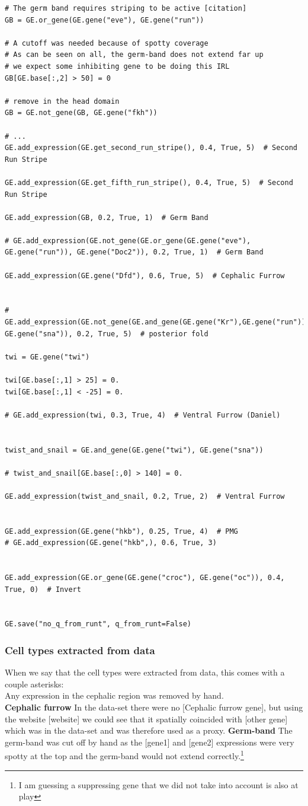 \begin{lstlisting}
# The germ band requires striping to be active [citation]
GB = GE.or_gene(GE.gene("eve"), GE.gene("run"))

# A cutoff was needed because of spotty coverage
# As can be seen on all, the germ-band does not extend far up
# we expect some inhibiting gene to be doing this IRL
GB[GE.base[:,2] > 50] = 0

# remove in the head domain
GB = GE.not_gene(GB, GE.gene("fkh"))

# ...
GE.add_expression(GE.get_second_run_stripe(), 0.4, True, 5)  # Second Run Stripe

GE.add_expression(GE.get_fifth_run_stripe(), 0.4, True, 5)  # Second Run Stripe

GE.add_expression(GB, 0.2, True, 1)  # Germ Band

# GE.add_expression(GE.not_gene(GE.or_gene(GE.gene("eve"), GE.gene("run")), GE.gene("Doc2")), 0.2, True, 1)  # Germ Band

GE.add_expression(GE.gene("Dfd"), 0.6, True, 5)  # Cephalic Furrow


# GE.add_expression(GE.not_gene(GE.and_gene(GE.gene("Kr"),GE.gene("run")), GE.gene("sna")), 0.2, True, 5)  # posterior fold

twi = GE.gene("twi")

twi[GE.base[:,1] > 25] = 0.
twi[GE.base[:,1] < -25] = 0.

# GE.add_expression(twi, 0.3, True, 4)  # Ventral Furrow (Daniel)


twist_and_snail = GE.and_gene(GE.gene("twi"), GE.gene("sna"))

# twist_and_snail[GE.base[:,0] > 140] = 0.

GE.add_expression(twist_and_snail, 0.2, True, 2)  # Ventral Furrow


GE.add_expression(GE.gene("hkb"), 0.25, True, 4)  # PMG
# GE.add_expression(GE.gene("hkb",), 0.6, True, 3)


GE.add_expression(GE.or_gene(GE.gene("croc"), GE.gene("oc")), 0.4, True, 0)  # Invert


GE.save("no_q_from_runt", q_from_runt=False)
\end{lstlisting}

\subsubsection{Cell types extracted from data}
When we say that the cell types were extracted from data, this comes with a couple asterisks:\\
Any expression in the cephalic region was removed by hand.\\
\textbf{Cephalic furrow}
In the data-set there were no [Cephalic furrow gene], but using the website [website] we could see that it spatially coincided with [other gene] which was in the data-set and was therefore used as a proxy. 
\textbf{Germ-band}
The germ-band was cut off by hand as the [gene1] and [gene2] expressions were very spotty at the top and the germ-band would not extend correctly.\footnote{I am guessing a suppressing gene that we did not take into account is also at play} 

